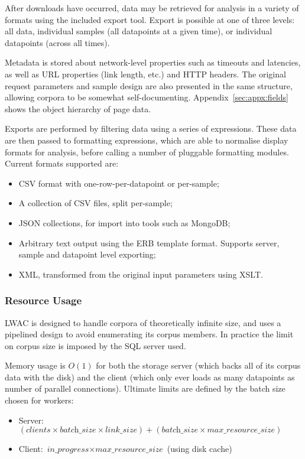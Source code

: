 After downloads have occurred, data may be retrieved for analysis in a variety of formats using the included export tool.  Export is possible at one of three levels: all data, individual samples (all datapoints at a given time), or individual datapoints (across all times).


Metadata is stored about network-level properties such as timeouts and latencies, as well as URL properties (link length, etc.) and HTTP headers.  The original request parameters and sample design are also presented in the same structure, allowing corpora to be somewhat self-documenting.  Appendix~\ref{sec:appx:fields} shows the object hierarchy of page data.


Exports are performed by filtering data using a series of expressions.  These data are then passed to formatting expressions, which are able to normalise display formats for analysis, before calling a number of pluggable formatting modules.  Current formats supported are:

\begin{itemize}
    \item CSV format with one-row-per-datapoint or per-sample;
    \item A collection of CSV files, split per-sample;
    \item JSON collections, for import into tools such as MongoDB;
    \item Arbitrary text output using the ERB template format.  Supports server, sample and datapoint level exporting;
    \item XML, transformed from the original input parameters using XSLT.
\end{itemize}



\subsubsection{Resource Usage}

LWAC is designed to handle corpora of theoretically infinite size, and uses a pipelined design to avoid enumerating its corpus members.  In practice the limit on corpus size is imposed by the SQL server used.

Memory usage is $O(1)$ for both the storage server (which backs all of its corpus data with the disk) and the client (which only ever loads as many datapoints as number of parallel connections).  Ultimate limits are defined by the batch size chosen for workers:

\begin{itemize}
    \item Server: $(\textit{clients} \times \textit{batch\_size} \times \textit{link\_size}) + (\textit{batch\_size} \times \textit{max\_resource\_size})$
    \item Client: $\textit{in\_progress} \times \textit{max\_resource\_size}$ (using disk cache)
\end{itemize}

